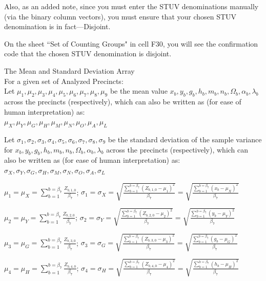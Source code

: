 Also, as an added note, since you must enter the STUV denominations manually (via the binary column vectors), you must ensure that your chosen STUV denomination is in fact---Disjoint.

On the sheet ``Set of Counting Groups" in cell F30, you will see the confirmation code that the chosen STUV denomination is disjoint.
\newpage
\begin{definition}{The Mean and Standard Deviation Array}\\
For a given set of Analyzed Precincts:\\
Let $\mu_{1}, \mu_{2}, \mu_{3}, \mu_{4}, \mu_{5}, \mu_{6}, \mu_{7}, \mu_{8}, \mu_{9}$ be the mean value $x_{b}, y_{b}, g_{b}, h_{b}, m_{b}, n_{b}, \Omega_{b}, \alpha_{b}, \lambda_{b}$ across the precincts (respectively), which can also be written as (for ease of human interpretation) as:\\
$\mu_{X}, \mu_{Y}, \mu_{G}, \mu_{H}, \mu_{M}, \mu_{N}, \mu_{O}, \mu_{A}, \mu_{L}$

Let $\sigma_{1}, \sigma_{2}, \sigma_{3}, \sigma_{4}, \sigma_{5}, \sigma_{6}, \sigma_{7}, \sigma_{8}, \sigma_{9}$ be the standard deviation of the sample variance for $x_{b}, y_{b}, g_{b}, h_{b}, m_{b}, n_{b}, \Omega_{b}, \alpha_{b}, \lambda_{b}$ across the precincts (respectively), which can also be written as (for ease of human interpretation) as:\\
$\sigma_{X}, \sigma_{Y}, \sigma_{G}, \sigma_{H}, \sigma_{M}, \sigma_{N}, \sigma_{O}, \sigma_{A}, \sigma_{L}$

$\mu_{1}=\mu_{X}=\sum_{b=1}^{b=\beta_{7}}\frac{Z_{b,1,0}}{\beta_{7}}$; $\sigma_{1}=\sigma_{X}=\sqrt{\frac{\sum_{b=1}^{b=\beta_{7}}(Z_{b,1,0}-\mu_{1})^2}{\beta_{7}}}=\sqrt{\frac{\sum_{b=1}^{b=\beta_{7}}(x_{b}-\mu_{X})^2}{\beta_{7}}}$

$\mu_{2}=\mu_{Y}=\sum_{b=1}^{b=\beta_{7}}\frac{Z_{b,2,0}}{\beta_{7}}$; $\sigma_{2}=\sigma_{Y}=\sqrt{\frac{\sum_{b=1}^{b=\beta_{7}}(Z_{b,2,0}-\mu_{2})^2}{\beta_{7}}}=\sqrt{\frac{\sum_{b=1}^{b=\beta_{7}}(y_{b}-\mu_{Y})^2}{\beta_{7}}}$

$\mu_{3}=\mu_{G}=\sum_{b=1}^{b=\beta_{7}}\frac{Z_{b,3,0}}{\beta_{7}}$; $\sigma_{3}=\sigma_{G}=\sqrt{\frac{\sum_{b=1}^{b=\beta_{7}}(Z_{b,3,0}-\mu_{3})^2}{\beta_{7}}}=\sqrt{\frac{\sum_{b=1}^{b=\beta_{7}}(g_{b}-\mu_{G})^2}{\beta_{7}}}$

$\mu_{4}=\mu_{H}=\sum_{b=1}^{b=\beta_{7}}\frac{Z_{b,4,0}}{\beta_{7}}$; $\sigma_{4}=\sigma_{H}=\sqrt{\frac{\sum_{b=1}^{b=\beta_{7}}(Z_{b,4,0}-\mu_{4})^2}{\beta_{7}}}=\sqrt{\frac{\sum_{b=1}^{b=\beta_{7}}(h_{b}-\mu_{H})^2}{\beta_{7}}}$


\end{definition}
